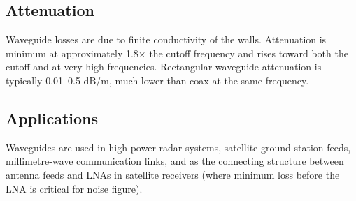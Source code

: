				

\subsection{Attenuation}

				

Waveguide losses are due to finite conductivity of the walls. Attenuation is minimum at approximately 1.8× the cutoff frequency and rises toward both the cutoff and at very high frequencies. Rectangular waveguide attenuation is typically 0.01–0.5 dB/m, much lower than coax at the same frequency.

				

\subsection{Applications}

				

Waveguides are used in high-power radar systems, satellite ground station feeds, millimetre-wave communication links, and as the connecting structure between antenna feeds and LNAs in satellite receivers (where minimum loss before the LNA is critical for noise figure).



